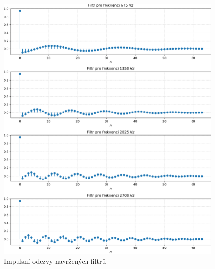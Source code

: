 \documentclass[a4paper, 11pt, final]{article}
\begin{document}
\begin{figure}[!hp]
    \centering
    \includegraphics[width=\textwidth]{img/07-impulse-responses.pdf}
    \caption{Impulsní odezvy navržených filtrů}
    \label{fig:filter-impulse-responses}
\end{figure}
\end{document}
